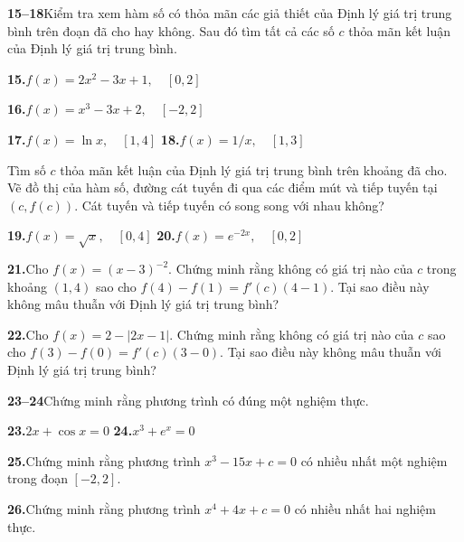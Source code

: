 \setlength{\parindent}{0pt}
\small

\noindent
\begin{minipage}[t]{0.485\textwidth}
  \vspace{0pt}
  \setlength{\parskip}{3.5pt}

  {\color{stewartcyan}\textbf{15--18}}\enspace Kiểm tra xem hàm số có thỏa mãn các giả thiết của Định lý giá trị trung bình trên đoạn đã cho hay không. Sau đó tìm tất cả các số $c$ thỏa mãn kết luận của Định lý giá trị trung bình.

  \textbf{15.}\enspace $f(x) = 2x^2 - 3x + 1, \quad [0, 2]$

  \textbf{16.}\enspace $f(x) = x^3 - 3x + 2, \quad [-2, 2]$

  \noindent
  \textbf{17.}\enspace $f(x) = \ln x, \quad [1, 4]$
  \hfill
  \textbf{18.}\enspace $f(x) = 1/x, \quad [1, 3]$

  \exerciseline

  \graphingicon{}\enspace Tìm số $c$ thỏa mãn kết luận của Định lý giá trị trung bình trên khoảng đã cho. Vẽ đồ thị của hàm số, đường cát tuyến đi qua các điểm mút và tiếp tuyến tại $(c, f(c))$. Cát tuyến và tiếp tuyến có song song với nhau không?

  \noindent
  \textbf{19.}\enspace $f(x) = \sqrt{x}, \quad [0, 4]$
  \hfill
  \textbf{20.}\enspace $f(x) = e^{-2x}, \quad [0, 2]$

  \exerciseline

  \textbf{21.}\enspace Cho $f(x) = (x - 3)^{-2}$. Chứng minh rằng không có giá trị nào của $c$ trong khoảng $(1, 4)$ sao cho $f(4) - f(1) = f'(c)(4 - 1)$. Tại sao điều này không mâu thuẫn với Định lý giá trị trung bình?

  \textbf{22.}\enspace Cho $f(x) = 2 - |2x - 1|$. Chứng minh rằng không có giá trị nào của $c$ sao cho $f(3) - f(0) = f'(c)(3 - 0)$. Tại sao điều này không mâu thuẫn với Định lý giá trị trung bình?

  {\color{stewartcyan}\textbf{23--24}}\enspace Chứng minh rằng phương trình có đúng một nghiệm thực.

  \noindent
  \textbf{23.}\enspace $2x + \cos x = 0$
  \hfill
  \textbf{24.}\enspace $x^3 + e^x = 0$

  \exerciseline

  \textbf{25.}\enspace Chứng minh rằng phương trình $x^3 - 15x + c = 0$ có nhiều nhất một nghiệm trong đoạn $[-2, 2]$.

  \textbf{26.}\enspace Chứng minh rằng phương trình $x^4 + 4x + c = 0$ có nhiều nhất hai nghiệm thực.


\end{minipage}

